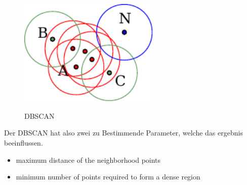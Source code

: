 \begin{figure}[!ht]
\begin{center}
\caption{\acs{DBSCAN} \cite{DBSCAN}}
\includegraphics[width=0.6\textwidth]{bilder/dbscan.pdf}
\label{platform}
\end{center}
\end{figure}



Der \ac{DBSCAN} hat also zwei zu Bestimmende Parameter, welche das ergebnis beeinflussen.
\begin{itemize}
 \item maximum distance of the neighborhood points
 \item minimum number of points required to form a dense region
\end{itemize}







